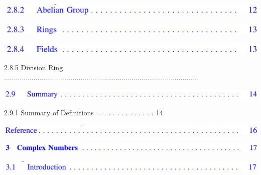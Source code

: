 \documentclass[10pt]{article}
\begin{document}
\begin{center}
\includegraphics[max width=\textwidth]{2023_04_20_41f1ceac5a31dc7d1b59g-009(2)}
\end{center}

\begin{center}
\includegraphics[max width=\textwidth]{2023_04_20_41f1ceac5a31dc7d1b59g-009(17)}
\end{center}

\begin{center}
\includegraphics[max width=\textwidth]{2023_04_20_41f1ceac5a31dc7d1b59g-009(7)}
\end{center}

2.8.5 Division Ring $\ldots \ldots \ldots \ldots \ldots \ldots \ldots \ldots \ldots \ldots \ldots \ldots \ldots \ldots \ldots \ldots \ldots \ldots \ldots \ldots \ldots \ldots \ldots \ldots \ldots \ldots \ldots \ldots \ldots \ldots \ldots \ldots \ldots$

\begin{center}
\includegraphics[max width=\textwidth]{2023_04_20_41f1ceac5a31dc7d1b59g-009(13)}
\end{center}

2.9.1 Summary of Definitions ... . . . . . . . . . . . . 14

\begin{center}
\includegraphics[max width=\textwidth]{2023_04_20_41f1ceac5a31dc7d1b59g-009(3)}
\end{center}

\begin{center}
\includegraphics[max width=\textwidth]{2023_04_20_41f1ceac5a31dc7d1b59g-010(5)}
\end{center}

\begin{center}
\includegraphics[max width=\textwidth]{2023_04_20_41f1ceac5a31dc7d1b59g-010(4)}
\end{center}
\end{document}
